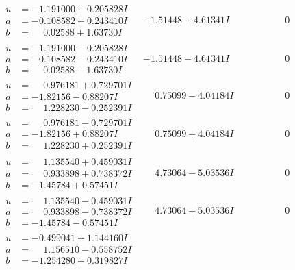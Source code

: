 \documentclass[1p]{elsarticle_modified}
\theoremstyle{definition}
\begin{document}
$$\begin{array}{c|c|c}
\begin{aligned}
u &= -1.191000 + 0.205828 I \\
a &= -0.108582 + 0.243410 I \\
b &= \phantom{-}0.02588 + 1.63730 I\end{aligned}
 & -1.51448 + 4.61341 I & \phantom{-0.000000 } 0 \\ \hline\begin{aligned}
u &= -1.191000 - 0.205828 I \\
a &= -0.108582 - 0.243410 I \\
b &= \phantom{-}0.02588 - 1.63730 I\end{aligned}
 & -1.51448 - 4.61341 I & \phantom{-0.000000 } 0 \\ \hline\begin{aligned}
u &= \phantom{-}0.976181 + 0.729701 I \\
a &= -1.82156 - 0.88207 I \\
b &= \phantom{-}1.228230 - 0.252391 I\end{aligned}
 & \phantom{-}0.75099 - 4.04184 I & \phantom{-0.000000 } 0 \\ \hline\begin{aligned}
u &= \phantom{-}0.976181 - 0.729701 I \\
a &= -1.82156 + 0.88207 I \\
b &= \phantom{-}1.228230 + 0.252391 I\end{aligned}
 & \phantom{-}0.75099 + 4.04184 I & \phantom{-0.000000 } 0 \\ \hline\begin{aligned}
u &= \phantom{-}1.135540 + 0.459031 I \\
a &= \phantom{-}0.933898 + 0.738372 I \\
b &= -1.45784 + 0.57451 I\end{aligned}
 & \phantom{-}4.73064 - 5.03536 I & \phantom{-0.000000 } 0 \\ \hline\begin{aligned}
u &= \phantom{-}1.135540 - 0.459031 I \\
a &= \phantom{-}0.933898 - 0.738372 I \\
b &= -1.45784 - 0.57451 I\end{aligned}
 & \phantom{-}4.73064 + 5.03536 I & \phantom{-0.000000 } 0 \\ \hline\begin{aligned}
u &= -0.499041 + 1.144160 I \\
a &= \phantom{-}1.156510 - 0.558752 I \\
b &= -1.254280 + 0.319827 I\end{aligned}

\end{array}$$
\end{document}
